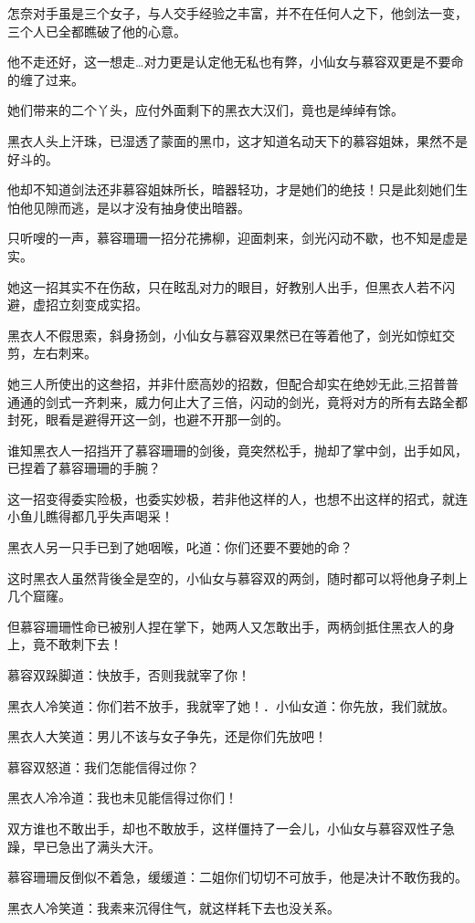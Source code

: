 \documentclass[12pt,oneside]{book}
\begin{document}
怎奈对手虽是三个女子，与人交手经验之丰富，并不在任何人之下，他剑法一变，三个人已全都瞧破了他的心意。

他不走还好，这一想走\ldots 对力更是认定他无私也有弊，小仙女与慕容双更是不要命的缠了过来。

她们带来的二个丫头，应付外面剩下的黑衣大汉们，竟也是绰绰有馀。

黑衣人头上汗珠，已湿透了蒙面的黑巾，这才知道名动天下的慕容姐妹，果然不是好斗的。

他却不知道剑法还非慕容姐妹所长，暗器轻功，才是她们的绝技！只是此刻她们生怕他见隙而逃，是以才没有抽身使出暗器。

只听嗖的一声，慕容珊珊一招分花拂柳，迎面刺来，剑光闪动不歇，也不知是虚是实。

她这一招其实不在伤敌，只在眩乱对力的眼目，好教别人出手，但黑衣人若不闪避，虚招立刻变成实招。

黑衣人不假思索，斜身扬剑，小仙女与慕容双果然已在等着他了，剑光如惊虹交剪，左右刺来。

她三人所使出的这叁招，并非什麽高妙的招数，但配合却实在绝妙无此,三招普普通通的剑式一齐刺来，威力何止大了三倍，闪动的剑光，竟将对方的所有去路全都封死，眼看是避得开这一剑，也避不开那一剑的。

谁知黑衣人一招挡开了慕容珊珊的剑後，竟突然松手，抛却了掌中剑，出手如风，已捏着了慕容珊珊的手腕？

这一招变得委实险极，也委实妙极，若非他这样的人，也想不出这样的招式，就连小鱼儿瞧得都几乎失声喝采！

黑衣人另一只手已到了她咽喉，叱道：你们还要不要她的命？

这时黑衣人虽然背後全是空的，小仙女与慕容双的两剑，随时都可以将他身子刺上几个窟窿。

但慕容珊珊性命已被别人捏在掌下，她两人又怎敢出手，两柄剑抵住黑衣人的身上，竟不敢刺下去！

慕容双跺脚道：快放手，否则我就宰了你！

黑衣人冷笑道：你们若不放手，我就宰了她！．小仙女道：你先放，我们就放。

黑衣人大笑道：男儿不该与女子争先，还是你们先放吧！

慕容双怒道：我们怎能信得过你？

黑衣人冷冷道：我也未见能信得过你们！

双方谁也不敢出手，却也不敢放手，这样僵持了一会儿，小仙女与慕容双性子急躁，早已急出了满头大汗。

慕容珊珊反倒似不着急，缓缓道：二姐你们切切不可放手，他是决计不敢伤我的。

黑衣人冷笑道：我素来沉得住气，就这样耗下去也没关系。
\end{document}
